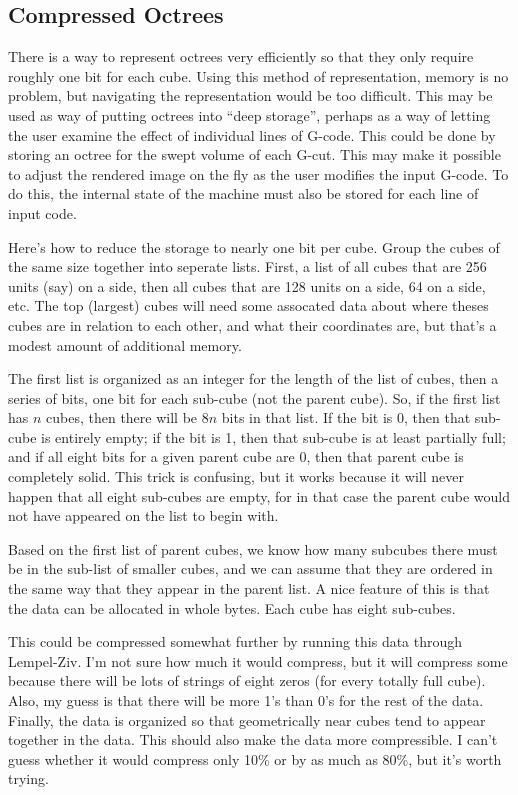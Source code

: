 \documentclass[titlepage,oneside,10pt]{article}
\begin{document}
\subsection{Compressed Octrees} 

There is a way to represent octrees very
efficiently so that they only require roughly one bit for each
cube. Using this method of representation, memory is no problem, but
navigating the representation would be too difficult. This may be used
as way of putting octrees into ``deep storage'', perhaps as a way of
letting the user examine the effect of individual lines of
G-code. This could be done by storing an octree for the swept volume
of each G-cut. This may make it possible to adjust the rendered image
on the fly as the user modifies the input G-code. To do this, the
internal state of the machine must also be stored for each line of
input code.

Here's how to reduce the storage to nearly one bit per cube. Group the
cubes of the same size together into seperate lists. First, a list of
all cubes that are 256 units (say) on a side, then all cubes that are 128 units
on a side, 64 on a side, etc. The top (largest) cubes will need some assocated 
data about where theses cubes are in relation to each other, and what their 
coordinates are, but that's a modest amount of additional memory.

The first list is organized as an integer for the length of the list of
cubes, then a series of bits, one bit for each sub-cube (not the
parent cube). So, if the first list has $n$ cubes, then there will be
$8n$ bits in that list. If the bit is 0, then that sub-cube is
entirely empty; if the bit is 1, then that sub-cube is at least
partially full; and if all eight bits for a given parent cube are 0,
then that parent cube is completely solid. This trick is confusing,
but it works because it will never happen that all eight sub-cubes are
empty, for in that case the parent cube would not have appeared on the
list to begin with.

Based on the first list of parent cubes, we know how many subcubes there must
be in the sub-list of smaller cubes, and we can assume that they are ordered
in the same way that they appear in the parent list. A nice feature of this is
that the data can be allocated in whole bytes. Each cube has eight sub-cubes.

This could be compressed somewhat further by running this data through
Lempel-Ziv. I'm not sure how much it would compress, but it will
compress some because there will be lots of strings of eight zeros
(for every totally full cube). Also, my guess is that there will be
more 1's than 0's for the rest of the data. Finally, the data is
organized so that geometrically near cubes tend to appear together in
the data. This should also make the data more compressible. I can't
guess whether it would compress only 10\% or by as much as 80\%, but
it's worth trying.
\end{document}
